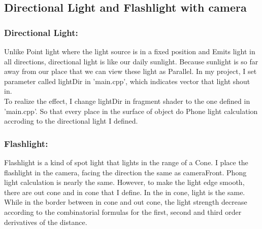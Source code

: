 \documentclass[acmtog]{acmart}
\begin{document}
\subsection{Directional Light and Flashlight with camera}
\subsubsection{Directional Light: }
Unlike Point light where the light source is in a fixed position and Emits light in all directions, directional light is like our daily sunlight. Because sunlight is so far away from our place that we can view these light as Parallel. In my project, I set parameter called lightDir in 'main.cpp', which indicates vector that light shout in.\\
To realize the effect, I change lightDir in fragment shader to the one defined in 'main.cpp'. So that every place in the surface of object do Phone light calculation accroding to the directional light I defined.
\subsubsection{Flashlight: }
Flashlight is a kind of spot light that lights in the range of a Cone. I place the flashlight in the camera, facing the direction the same as cameraFront. Phong light calculation is nearly the same. However, to make the light edge smooth, there are out cone and in cone that I define. In the in cone, light is the same. While in the border between in cone and out cone, the light strength decrease according to the combinatorial formulas for the first, second and third order derivatives of the distance.
\end{document}

